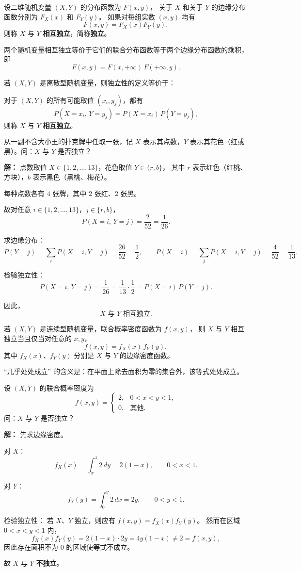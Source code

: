 \begin{definition}[随机变量的独立性]\label{def:independence}
设二维随机变量 $(X,Y)$ 的分布函数为 $F(x,y)$，
关于 $X$ 和关于 $Y$ 的边缘分布函数分别为 $F_X(x)$ 和 $F_Y(y)$。
如果对每组实数 $(x,y)$ 均有
\[
F(x,y) = F_X(x) F_Y(y),
\tag{2.3.1}
\]
则称 $X$ 与 $Y$ \textbf{相互独立}，简称\textbf{独立}。
\end{definition}
两个随机变量相互独立等价于它们的联合分布函数等于两个边缘分布函数的乘积，即
\[
F(x,y)=F(x,+\infty)\,F(+\infty,y).
\]

\begin{definition}[离散型随机变量的独立性]
若 $(X,Y)$ 是离散型随机变量，则独立性的定义等价于：

对于 $(X,Y)$ 的所有可能取值 $(x_i,y_j)$，都有
\[
P(X=x_i,\,Y=y_j)=P(X=x_i)\,P(Y=y_j),
\]
则称 $X$ 与 $Y$ \textbf{相互独立}。
\end{definition}
\begin{example}
从一副不含大小王的扑克牌中任取一张，记 $X$ 表示其点数，$Y$ 表示其花色（红或黑）。问：$X$ 与 $Y$ 是否独立？

\textbf{解：}  
点数取值 $X\in\{1,2,\dots,13\}$，花色取值 $Y\in\{r,b\}$，  
其中 $r$ 表示红色（红桃、方块），$b$ 表示黑色（黑桃、梅花）。

每种点数各有 $4$ 张牌，其中 $2$ 张红、$2$ 张黑。

故对任意 $i\in\{1,2,\dots,13\}$，$j\in\{r,b\}$，
\[
P(X=i,\,Y=j)=\frac{2}{52}=\frac{1}{26}.
\]

求边缘分布：
\[
P(Y=j)=\sum_i P(X=i,Y=j)=\frac{26}{52}=\frac{1}{2},
\qquad
P(X=i)=\sum_j P(X=i,Y=j)=\frac{4}{52}=\frac{1}{13}.
\]

检验独立性：
\[
P(X=i,\,Y=j)=\frac{1}{26}=\frac{1}{13}\cdot\frac{1}{2}=P(X=i)\,P(Y=j).
\]

因此，
\[
\boxed{X\text{ 与 }Y\text{ 相互独立.}}
\]
\end{example}
\begin{definition}[连续型随机变量的独立性]
若 $(X,Y)$ 是连续型随机变量，联合概率密度函数为 $f(x,y)$，
则 $X$ 与 $Y$ 相互独立当且仅当对任意的 $x,y$，
\[
f(x,y)=f_X(x)\,f_Y(y),
\]
其中 $f_X(x)$、$f_Y(y)$ 分别是 $X$ 与 $Y$ 的边缘密度函数。

“几乎处处成立” 的含义是：在平面上除去面积为零的集合外，该等式处处成立。
\end{definition}
\begin{example}
设 $(X,Y)$ 的联合概率密度为
\[
f(x,y)=
\begin{cases}
2, & 0<x<y<1,\\[4pt]
0, & \text{其他}.
\end{cases}
\]
问：$X$ 与 $Y$ 是否独立？

\textbf{解：}
先求边缘密度。

对 $X$：
\[
f_X(x)=\int_x^1 2\,dy = 2(1-x),\qquad 0<x<1.
\]

对 $Y$：
\[
f_Y(y)=\int_0^y 2\,dx = 2y,\qquad 0<y<1.
\]

检验独立性：
若 $X$、$Y$ 独立，则应有 $f(x,y)=f_X(x)f_Y(y)$。
然而在区域 $0<x<y<1$ 内，
\[
f_X(x)f_Y(y)=2(1-x)\cdot 2y = 4y(1-x)\ne 2=f(x,y),
\]
因此存在面积不为 $0$ 的区域使等式不成立。

故 $X$ 与 $Y$ \textbf{不独立}。
\end{example}
